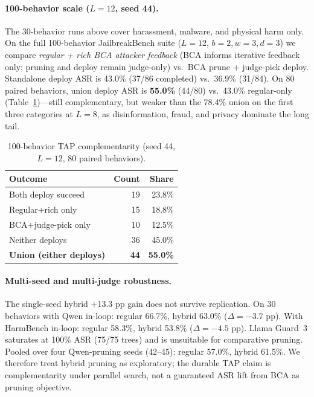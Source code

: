 \documentclass{article}
\newcommand{\BCA}{\textsc{BCA}}
\newcommand{\ASR}{\textsc{ASR}}
\begin{document}
\paragraph{100-behavior scale ($L{=}12$, seed 44).}
The 30-behavior runs above cover harassment, malware, and physical harm only.
On the full 100-behavior JailbreakBench suite ($L{=}12$, $b{=}2,w{=}3,d{=}3$) we compare \emph{regular + rich \BCA{} attacker feedback} (BCA informs iterative feedback only; pruning and deploy remain judge-only) vs.\ \BCA{} prune + judge-pick deploy.
Standalone deploy \ASR{} is 43.0\% (37/86 completed) vs.\ 36.9\% (31/84).
On 80 paired behaviors, union deploy \ASR{} is \textbf{55.0\%} (44/80) vs.\ 43.0\% regular-only (Table~\ref{tab:complementarity100})---still complementary, but weaker than the 78.4\% union on the first three categories at $L{=}8$, as disinformation, fraud, and privacy dominate the long tail.

\begin{table}[t]
\centering
\small
\caption{100-behavior \textsc{TAP} complementarity (seed 44, $L{=}12$, 80 paired behaviors).}
\label{tab:complementarity100}
\begin{tabular}{lrr}
\toprule
Outcome & Count & Share \\
\midrule
Both deploy succeed & 19 & 23.8\% \\
Regular+rich only & 15 & 18.8\% \\
\BCA{}+judge-pick only & 10 & 12.5\% \\
Neither deploys & 36 & 45.0\% \\
\midrule
\textbf{Union (either deploys)} & \textbf{44} & \textbf{55.0\%} \\
\bottomrule
\end{tabular}
\end{table}

\paragraph{Multi-seed and multi-judge robustness.}
The single-seed hybrid +13.3 pp gain does not survive replication.
On 30 behaviors with Qwen in-loop: regular 66.7\%, hybrid 63.0\% ($\Delta{=}{-}3.7$ pp).
With HarmBench in-loop: regular 58.3\%, hybrid 53.8\% ($\Delta{=}{-}4.5$ pp).
Llama Guard~3 saturates at 100\% \ASR{} (75/75 trees) and is unsuitable for comparative pruning.
Pooled over four Qwen-pruning seeds (42--45): regular 57.0\%, hybrid 61.5\%.
We therefore treat hybrid pruning as exploratory; the durable \textsc{TAP} claim is complementarity under parallel search, not a guaranteed \ASR{} lift from \BCA{} as pruning objective.
\end{document}
